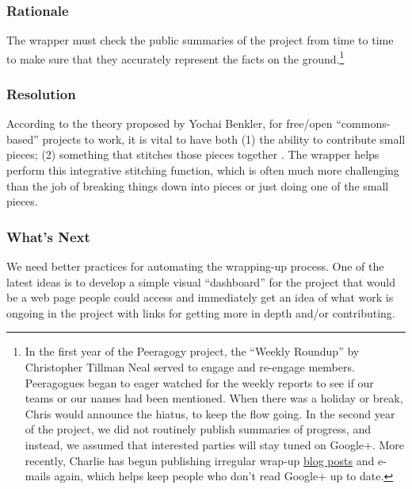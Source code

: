 \subsubsection*{Rationale}
The wrapper must check the public summaries of the project from time to time to make sure that they accurately represent the facts on the ground.\footnote{In the first year of the Peeragogy project, the ``Weekly Roundup'' by Christopher Tillman Neal served to engage and re-engage members. Peeragogues began to eager watched for the weekly reports to see if our teams or our names had been mentioned. When there was a holiday or break, Chris would announce the hiatus, to keep the flow going. In the second year of the project, we did not routinely publish summaries of progress, and instead, we assumed that interested parties will stay tuned on Google+.  More recently, Charlie has begun publishing irregular wrap-up \href{http://peeragogy.org/peeragogy-wrapper-post-9-feb-5-apr-2015/}{blog posts} and e-mails again, which helps keep people who don't read Google+ up to date.}

\subsubsection*{Resolution} 
According to the theory proposed by Yochai Benkler, for free/open ``commons-based'' projects to work, it is vital to have both (1) the ability to contribute small pieces; (2) something that stitches those pieces together \cite{coases-penguin}. The wrapper helps perform this integrative stitching function, which is often much more challenging than the job of breaking things down into pieces or just doing one of the small pieces.

\subsubsection*{What's Next}
We need better practices for automating the wrapping-up process. One of the latest ideas is to develop a simple visual ``dashboard'' for the project that would be a web page people could access and immediately get an idea of what work is ongoing in the project with links for getting more in depth and/or contributing.


